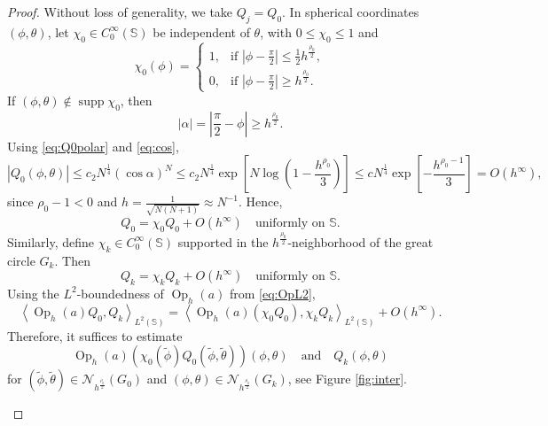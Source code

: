 \documentclass[12pt,reqno]{amsart}
\DeclareMathOperator{\Op}{Op}
\DeclareMathOperator{\supp}{supp}
\newcommand{\Nc}{\mathcal{N}}
\newcommand{\Sb}{\mathbb{S}}
\theoremstyle{plain}
\theoremstyle{definition}
\theoremstyle{remark}
\numberwithin{equation}{section}
\begin{document}
\begin{proof}
Without loss of generality, we take $Q_j=Q_0$. In spherical coordinates $(\phi,\theta)$, let $\chi_0\in C_0^\infty(\Sb)$ be independent of $\theta$, with $0\le\chi_0\le1$ and
$$\chi_0(\phi)=\begin{cases}
1, & \text{if }\left|\phi-\frac\pi2\right|\le\frac12h^{\frac{\rho_0}{2}},\\ 
0, & \text{if }\left|\phi-\frac\pi2\right|\ge h^{\frac{\rho_0}{2}}.
\end{cases}$$
If $(\phi,\theta)\notin\supp\chi_0$, then 
$$|\alpha|=\left|\frac\pi2-\phi\right|\ge h^{\frac{\rho_0}{2}}.$$
Using \eqref{eq:Q0polar} and \eqref{eq:cos},
$$\left|Q_0(\phi,\theta)\right|\le c_2N^\frac14(\cos\alpha)^N\le c_2N^\frac14\exp\left[N\log\left(1-\frac{h^{\rho_0}}{3}\right)\right]\le cN^\frac14\exp\left[-\frac{h^{\rho_0-1}}{3}\right]=O\left(h^\infty\right),$$
since $\rho_0-1<0$ and $h=\frac{1}{\sqrt{N(N+1)}}\approx N^{-1}$. Hence,
$$Q_0=\chi_0Q_0+O\left(h^\infty\right)\quad\text{uniformly on }\Sb.$$
Similarly, define $\chi_k\in C_0^\infty(\Sb)$ supported in the $h^{\frac{\rho_0}{2}}$-neighborhood of the great circle $G_k$. Then
$$Q_k=\chi_kQ_k+O\left(h^\infty\right)\quad\text{uniformly on }\Sb.$$
Using the $L^2$-boundedness of $\Op_h(a)$ from \eqref{eq:OpL2},
$$\left\langle\Op_h(a)Q_0,Q_k\right\rangle_{L^2(\Sb)}=\left\langle\Op_h(a)\left(\chi_0Q_0\right),\chi_kQ_k\right\rangle_{L^2(\Sb)}+O\left(h^\infty\right).$$
Therefore, it suffices to estimate
$$\Op_h(a)\left(\chi_0(\tilde\phi)Q_0(\tilde\phi,\tilde\theta)\right)(\phi,\theta)\quad\text{and}\quad Q_k(\phi,\theta)$$
for $(\tilde\phi,\tilde\theta)\in\Nc_{h^{\frac{\rho_0}{2}}}(G_0)$ and $(\phi,\theta)\in\Nc_{h^{\frac{\rho_0}{2}}}(G_k)$, see Figure \ref{fig:inter}.  

\begin{figure}[H]
\end{figure}
\end{proof}
\end{document}
